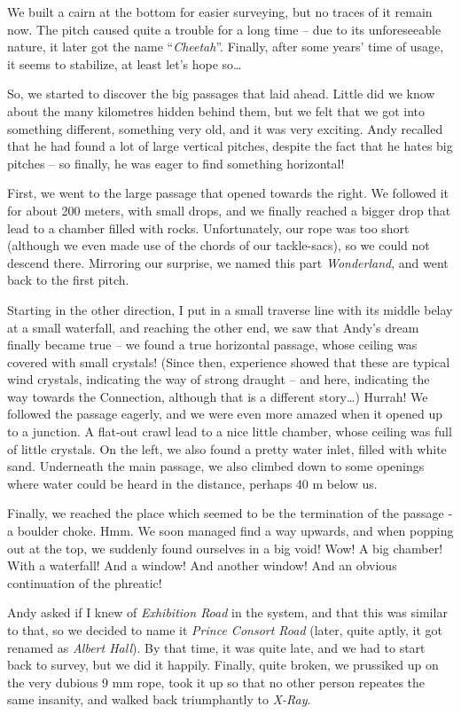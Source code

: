 We built a cairn at the bottom for easier surveying, but no traces of it
remain now. The pitch caused quite a trouble for a long time -- due to
its unforeseeable nature, it later got the name ``\emph{Cheetah}''.
Finally, after some years' time of usage, it seems to stabilize, at
least let's hope so\ldots{}

So, we started to discover the big passages that laid ahead. Little did
we know about the many kilometres hidden behind them, but we felt that
we got into something different, something very old, and it was very
exciting. Andy recalled that he had found a lot of large vertical
pitches, despite the fact that he hates big pitches -- so finally, he
was eager to find something horizontal!

First, we went to the large passage that opened towards the right. We
followed it for about 200 meters, with small drops, and we finally
reached a bigger drop that lead to a chamber filled with rocks.
Unfortunately, our rope was too short (although we even made use of the
chords of our tackle-sacs), so we could not descend there. Mirroring our
surprise, we named this part \emph{Wonderland}, and went back to the
first pitch.

Starting in the other direction, I put in a small traverse line with its
middle belay at a small waterfall, and reaching the other end, we saw
that Andy's dream finally became true -- we found a true horizontal
passage, whose ceiling was covered with small crystals! (Since then,
experience showed that these are typical wind crystals, indicating the
way of strong draught -- and here, indicating the way towards the
Connection, although that is a different story\ldots{}) Hurrah! We
followed the passage eagerly, and we were even more amazed when it
opened up to a junction. A flat-out crawl lead to a nice little chamber,
whose ceiling was full of little crystals. On the left, we also found a
pretty water inlet, filled with white sand. Underneath the main passage,
we also climbed down to some openings where water could be heard in the
distance, perhaps 40 m below us.

Finally, we reached the place which seemed to be the termination of the
passage - a boulder choke. Hmm. We soon managed find a way upwards, and
when popping out at the top, we suddenly found ourselves in a big void!
Wow! A big chamber! With a waterfall! And a window! And another window!
And an obvious continuation of the phreatic!

Andy asked if I knew of \emph{Exhibition Road} in the system, and that
this was similar to that, so we decided to name it \emph{Prince Consort
Road} (later, quite aptly, it got renamed as \emph{Albert Hall}). By
that time, it was quite late, and we had to start back to survey, but we
did it happily. Finally, quite broken, we prussiked up on the very
dubious 9 mm rope, took it up so that no other person repeates the same
insanity, and walked back triumphantly to \emph{X-Ray}.

